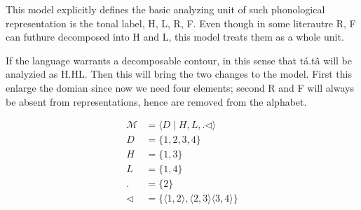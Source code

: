 This model explicitly defines the basic analyzing unit of such 
phonological representation is the tonal label, H, L, R, F. 
Even though in some literautre R, F can futhure decomposed into
H and L, this model treats them as a whole unit. 

If the language warrants a decomposable contour, in this sense
that tá.tâ will be analyzied as H.HL. Then this will bring the 
two changes to the model. First this enlarge the domian since now
we need four elements; second R and F will always be absent from 
representations, hence are removed from the alphabet.


\begin{figure}[ht]
    \centering  
   
    \begin{minipage}{.45\textwidth}
        \centering

        
    \end{minipage}
    \hfill
    \begin{minipage}{0.50\textwidth}
        \small

        \[
        \begin{aligned}
            \mathcal{M} &= \langle D \mid H,L, . \lhd\rangle \\
            D           &= \{1,2,3,4\} \\
            H           &= \{1,3\} \\
            L           &= \{1,4\} \\
            .           &= \{2\} \\
            \lhd        &= \{
                \langle1,2\rangle,
                \langle2,3\rangle
                \langle3,4\rangle
            \}
        \end{aligned}
        \]


\end{minipage}
\end{figure}
